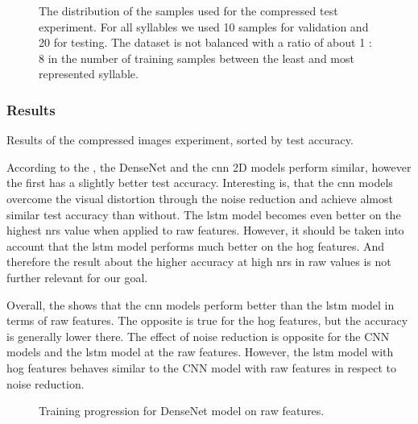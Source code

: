 \begin{figure}[ht!]
\centering
  \hfill
  \caption{The distribution of the samples used for the compressed test experiment. For all syllables we used 10 samples for validation and 20 for testing. The dataset is not balanced with a ratio of about 1 : 8 in the number of training samples between the least and most represented syllable.}
  \label{fig:dataset_sct_compressed}
\end{figure}

\subsubsection{Results}
\begin{table}[h!]
\centering

\caption{Results of the compressed images experiment, sorted by test accuracy.}
\label{tab:result_overview_sct_compressed}
\end{table}
According to the , the DenseNet and the \gls{cnn} 2D models perform similar, however the first has a slightly better test accuracy.
Interesting is, that the \gls{cnn} models overcome the visual distortion through the noise reduction and achieve almost similar test accuracy than without.
The \gls{lstm} model becomes even better on the highest \gls{nrs} value when applied to raw features.
However, it should be taken into account that the \gls{lstm} model performs much better on the \gls{hog} features.
And therefore the result about the higher accuracy at high \gls{nrs} in raw values is not further relevant for our goal.

Overall, the  shows that the \gls{cnn} models perform better than the \gls{lstm} model in terms of raw features. The opposite is true for the \gls{hog} features, but the accuracy is generally lower there. The effect of noise reduction is opposite for the CNN models and the \gls{lstm} model at the raw features. However, the \gls{lstm} model with \gls{hog} features behaves similar to the CNN model with raw features in respect to noise reduction.

\begin{figure}[ht!]
\centering
  \hfill
  \caption{Training progression for DenseNet model \cite{nn_densNet_sct_compressed_nrs0_raw_100} on raw features.}
  \label{fig:train_val_densNet_sct_compressed_nrs0_raw_100}
\end{figure}

